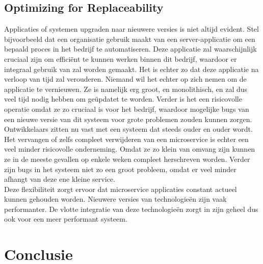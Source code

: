 \documentclass[pdftex,a4paper,12pt,twoside]{report}
\begin{document}
\section{Optimizing for Replaceability}
\label{sec:optimizing-for-replaceability}

Applicaties of systemen upgraden naar nieuwere versies is niet altijd evident. Stel bijvoorbeeld dat een organisatie gebruik maakt van een server-applicatie om een bepaald proces in het bedrijf te automatiseren. Deze applicatie zal waarschijnlijk cruciaal zijn om efficiënt te kunnen werken binnen dit bedrijf, waardoor er integraal gebruik van zal worden gemaakt. Het is echter zo dat deze applicatie na verloop van tijd zal verouderen. Niemand wil het echter op zich nemen om de applicatie te vernieuwen. Ze is namelijk erg groot, en monolithisch, en zal dus veel tijd nodig hebben om geüpdatet te worden. Verder is het een risicovolle operatie omdat ze zo cruciaal is voor het bedrijf, waardoor mogelijke bugs van een nieuwe versie van dit systeem voor grote problemen zouden kunnen zorgen. Ontwikkelaars zitten nu vast met een systeem dat steeds ouder en ouder wordt.
\\
Het vervangen of zelfs compleet verwijderen van een microservice is echter een veel minder risicovolle onderneming. Omdat ze zo klein van omvang zijn kunnen ze in de meeste gevallen op enkele weken compleet herschreven worden. Verder zijn bugs in het systeem niet zo een groot probleem, omdat er veel minder afhangt van deze ene kleine service.
\\
Deze flexibiliteit zorgt ervoor dat microservice applicaties constant actueel kunnen gehouden worden. Nieuwere versies van technologieën zijn vaak performanter. De vlotte integratie van deze technologieën zorgt in zijn geheel dus ook voor een meer performant systeem.



\chapter{Conclusie}
\label{ch:conclusie}







\listoffigures
\listoftables
\end{document}
